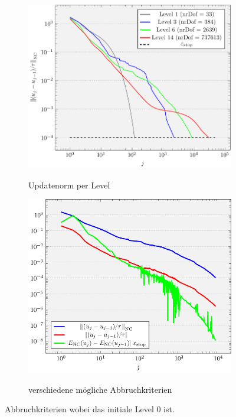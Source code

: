 \begin{figure}[p]
  \centering
  \begin{subfigure}[b]{.5\linewidth}
    \centering
    \caption{Updatenorm per Level}
    \includegraphics[width=\linewidth]
      {pictures/chapExperiments/secExactSol/iteration/lvlWise/termLvl.pdf}
    \label{fig:iterationLevel}
  \end{subfigure}
  \quad
  \begin{subfigure}[b]{.46\linewidth}
    \centering
    \caption{verschiedene mögliche Abbruchkriterien}
    \includegraphics[width=\linewidth]
      {pictures/chapExperiments/secExactSol/iteration/lvlWise/termComp.pdf}
    \label{fig:iterationTerminationVariants}
  \end{subfigure}
  \caption{Abbruchkriterien wobei das initiale Level 0 ist.}
  \label{fig:iterationTermination}
\end{figure}
